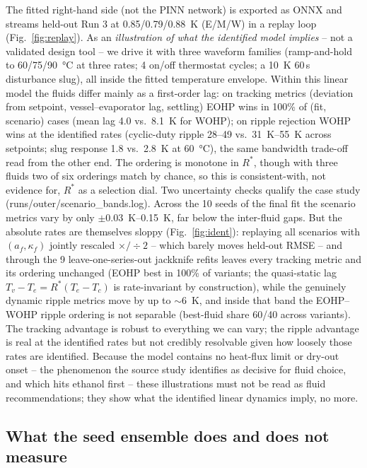 The fitted right-hand side (not the PINN network) is exported as ONNX and streams held-out Run 3 at
0.85/0.79/\SI{0.88}{\kelvin} (E/M/W) in a replay loop (Fig.~\ref{fig:replay}). As an \emph{illustration of what the
identified model implies} -- not a validated design tool -- we drive it with three waveform families (ramp-and-hold
to 60/75/\SI{90}{\celsius} at three rates; 4 on/off thermostat cycles; a \SI{10}{\kelvin} 60\,s disturbance slug),
all inside the fitted temperature envelope. Within this linear model the fluids differ mainly as a first-order
lag: on tracking metrics (deviation from setpoint, vessel--evaporator lag, settling) EOHP wins in 100\% of
(fit, scenario) cases (mean lag 4.0 vs.\ \SI{8.1}{\kelvin} for WOHP); on ripple rejection WOHP wins at the
identified rates (cyclic-duty ripple 28--49 vs.\ \SIrange{31}{55}{\kelvin} across setpoints; slug response
1.8 vs.\ \SI{2.8}{\kelvin} at \SI{60}{\celsius}), the same bandwidth trade-off read from the other end. The ordering
is monotone in $R^*$, though with three fluids two of six orderings match by chance, so this is consistent-with,
not evidence for, $R^*$ as a selection dial. Two uncertainty checks qualify the case study
(runs/outer/scenario\_bands.log). Across the 10 seeds of the final fit the scenario metrics vary by only
$\pm$\SIrange{0.03}{0.15}{\kelvin}, far below the inter-fluid gaps. But the absolute rates are themselves sloppy
(Fig.~\ref{fig:ident}): replaying all scenarios with $(a_f,\kappa_f)$ jointly rescaled $\times/\div 2$ -- which
barely moves held-out RMSE -- and through the 9 leave-one-series-out jackknife refits leaves every tracking
metric and its ordering unchanged (EOHP best in 100\% of variants; the quasi-static lag $T_v{-}T_e =
R^*(T_e{-}T_c)$ is rate-invariant by construction), while the genuinely dynamic ripple metrics move by up to
$\sim$\SI{6}{\kelvin}, and inside that band the EOHP--WOHP ripple ordering is not separable (best-fluid share
60/40 across variants). The tracking advantage is robust to everything we can vary; the ripple advantage is real
at the identified rates but not credibly resolvable given how loosely those rates are identified. Because the
model contains no heat-flux limit or dry-out onset -- the phenomenon the source study identifies as decisive for
fluid choice, and which hits ethanol first -- these illustrations must not be read as fluid recommendations;
they show what the identified linear dynamics imply, no more.

\subsection{What the seed ensemble does and does not measure}

